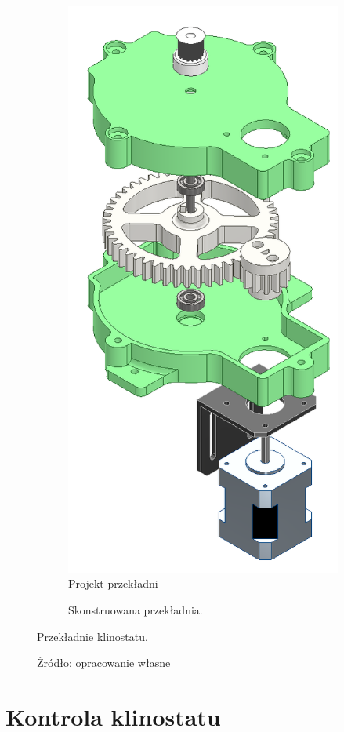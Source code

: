 \begin{figure}
	\centering
	
	\begin{subfigure}[b]{.49\textwidth}
		\centering
		\includegraphics[width=.6\textwidth]{przekladnia_projekt_exploded_shaded}
		\caption{Projekt przekładni} 
		\label{fig:projekt przekładni}
	\end{subfigure}
	\hfill%
	\begin{subfigure}[b]{.49\textwidth}
		\centering
		\setlength{\fboxsep}{0pt}
		\setlength{\fboxrule}{1pt}
		\caption{Skonstruowana przekładnia.} 
		
		\label{fig:gotowa przekładnia}
	\end{subfigure}

	\caption{Przekładnie klinostatu.}
	\caption*{Źródło: opracowanie własne}
	
\end{figure}


\section{Kontrola klinostatu}

